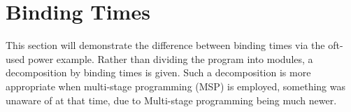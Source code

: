 \documentclass[12pt, titlepage]{article}
\newcounter{mnum}
\newcommand{\mthemnum}{M\themnum}
\begin{document}
%
%
%
%
%
%
%
%

\section{Binding Times}\label{sec:Binding_Times}

This section will demonstrate the difference between binding times via the 
oft-used power example. Rather than dividing the program into modules, a 
decomposition by binding times is given. Such a decomposition is more 
appropriate when multi-stage programming (MSP) is employed, something 
\cite{Parnas1972a} was unaware of at that time, due to Multi-stage programming 
being much newer. 
\end{document}
